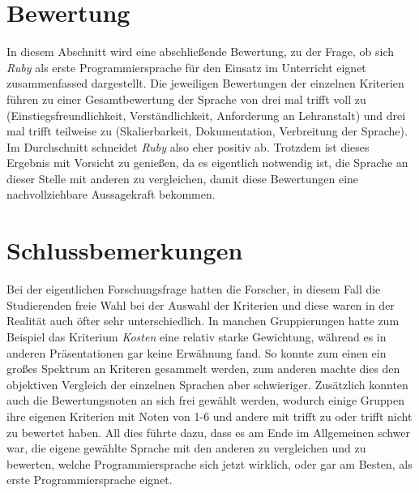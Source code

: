 \documentclass[12pt,DIV=14, version=first, BCOR=10mm,a4paper,twoside,parskip=half-,headsepline,headinclude]{scrartcl}
\begin{document}
\section{Bewertung}
\begin{flushleft}
In diesem Abschnitt wird eine abschließende Bewertung, zu der Frage, ob sich \textit{\glqq Ruby\grqq} als erste Programmiersprache für den Einsatz im Unterricht eignet zusammenfassed dargestellt. Die jeweiligen Bewertungen der einzelnen Kriterien führen zu einer Gesamtbewertung der Sprache von drei mal
{\glqq trifft voll zu\grqq} (Einstiegsfreundlichkeit, Verständlichkeit, Anforderung an Lehranstalt) und drei mal {\glqq trifft teilweise zu\grqq} (Skalierbarkeit, Dokumentation, Verbreitung der Sprache). Im Durchschnitt schneidet \textit{\glqq Ruby\grqq} also eher positiv ab.
Trotzdem ist dieses Ergebnis mit Vorsicht zu genießen, da es eigentlich notwendig ist, die Sprache an dieser Stelle mit anderen zu vergleichen, damit diese Bewertungen eine nachvollziehbare Aussagekraft bekommen.
\end{flushleft}

\section{Schlussbemerkungen}
\begin{flushleft}
Bei der eigentlichen Forschungsfrage hatten die Forscher, in diesem Fall die Studierenden freie Wahl bei der Auswahl der Kriterien und diese waren in der Realität auch öfter sehr unterschiedlich. In manchen Gruppierungen hatte zum Beispiel das Kriterium \textit{Kosten} eine relativ starke Gewichtung, während es in anderen Präsentationen gar keine Erwähnung fand. So konnte zum einen ein großes Spektrum an Kriteren gesammelt werden, zum anderen machte dies den objektiven Vergleich der einzelnen Sprachen aber schwieriger. Zusätzlich konnten auch die {\glqq Bewertungsnoten\grqq} an sich frei gewählt werden, wodurch einige Gruppen ihre eigenen Kriterien mit Noten von 1-6 und andere mit {\glqq trifft zu\grqq} oder {\glqq trifft nicht zu\grqq} bewertet haben. All dies führte dazu, dass es am Ende im Allgemeinen schwer war, die eigene gewählte Sprache mit den anderen zu vergleichen und zu bewerten, welche Programmiersprache sich jetzt wirklich, oder gar am {\glqq Besten\grqq}, als erste Programmiersprache eignet.
\end{flushleft}

\pagebreak
\end{document}

